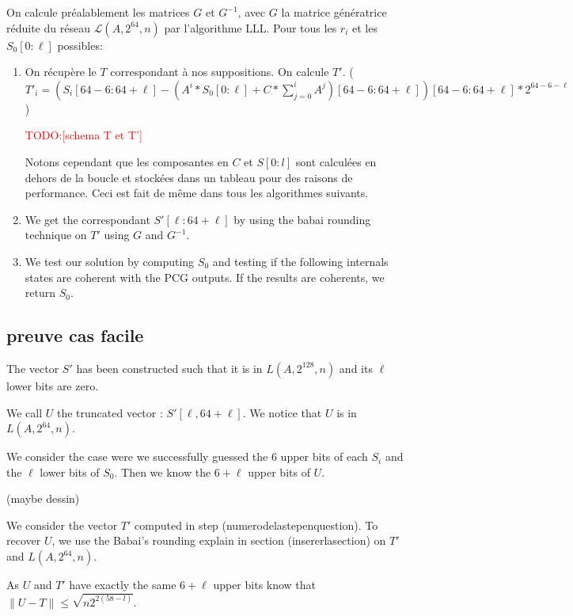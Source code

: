\documentclass[preprint,svgnames]{iacrtrans}
\newcommand{\todo}[1]{\textcolor{red}{TODO:[#1]}}
\begin{document}
On calcule préalablement les matrices $G$ et $G^{-1}$, avec $G$ la matrice génératrice réduite du réseau $\mathcal{L}(A,2^64,n)$ par l'algorithme LLL.
Pour tous les $r_i$ et les $S_0[0 : \ell]$ possibles:\\
\begin{enumerate}
\item On récupère le $T$ correspondant à nos suppositions. On calcule $T'$. ($T'_i = (S_i[64 - 6 : 64 + \ell] - (A^i*S_0[0 : \ell] + C * \sum_{j = 0}^i A^j)[64 - 6 : 64 + \ell])[64 - 6 : 64 + \ell] * 2^{64 - 6 - \ell}$)

\todo{schema T et T'}

Notons cependant que les composantes en $C$ et $S[0:l]$ sont calculées en dehors de la boucle et stockées dans un tableau pour des raisons de performance. Ceci est fait de même dans tous les algorithmes suivants.

\item We get the correspondant $S'[\ell : 64 + \ell]$ by using the babai rounding technique on $T'$ using $G$ and $G^{-1}$.

\item We test our solution by computing $S_0$ and testing if the following internals states are coherent with the PCG outputs. If the results are coherents, we return $S_0$.

\end{enumerate}


\subsection{preuve cas facile}

The vector \(S'\) has been constructed such that it is in \(L(A,2^{128},n)\) and its \(\ell\) lower bits are zero.

We call \(U\) the truncated vector : \(S'[\ell,64+\ell]\). We notice that \(U\) is in \(L(A,2^{64},n)\).

We consider the case were we successfully guessed the 6 upper bits of each \(S_i\) and the \(\ell\) lower bits of \(S_0\). Then we know the \(6+\ell\) upper bits of \(U\).

(maybe dessin)


We consider the vector \(T'\) computed in step (numerodelastepenquestion). To recover \(U\), we use the Babai's rounding explain in section (insererlasection) on \(T'\) and \(L(A,2^{64},n)\).

As \(U\) and \(T'\) have exactly the same \(6+\ell\) upper bits  know that \(\lVert U-T \rVert \leqslant \sqrt{n2^{2(58-l)}}\).
\end{document}
